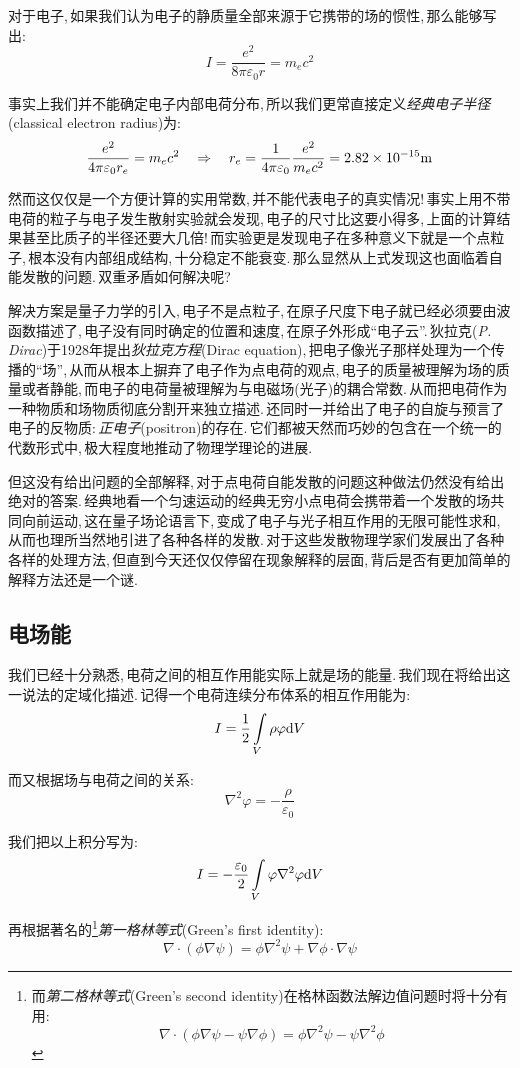 对于电子,\,如果我们认为电子的静质量全部来源于它携带的场的惯性,\,那么能够写出:
\[I=\frac{e^2}{8\pi\varepsilon_0 r}=m_e c^2\]

事实上我们并不能确定电子内部电荷分布,\,所以我们更常直接定义\emph{经典电子半径}(classical electron radius)为:
\[\frac{e^2}{4\pi\varepsilon_0 r_e}=m_e c^2\quad \Rightarrow \quad r_e=\frac{1}{4\pi\varepsilon_0} \frac{e^2}{m_e c^2}=2.82\times 10^{-15} {\rm m}\]

然而这仅仅是一个方便计算的实用常数,\,并不能代表电子的真实情况!\,事实上用不带电荷的粒子与电子发生散射实验就会发现,\,电子的尺寸比这要小得多,\,上面的计算结果甚至比质子的半径还要大几倍!\,而实验更是发现电子在多种意义下就是一个点粒子,\,根本没有内部组成结构,\,十分稳定不能衰变.\,那么显然从上式发现这也面临着自能发散的问题.\,双重矛盾如何解决呢?

解决方案是量子力学的引入,\,电子不是点粒子,\,在原子尺度下电子就已经必须要由波函数描述了,\,电子没有同时确定的位置和速度,\,在原子外形成``电子云''.\,狄拉克({\it P. Dirac})于1928年提出\emph{狄拉克方程}(Dirac equation),\,把电子像光子那样处理为一个传播的``场'',\,从而从根本上摒弃了电子作为点电荷的观点,\,电子的质量被理解为场的质量或者静能,\,而电子的电荷量被理解为与电磁场(光子)的耦合常数.\,从而把电荷作为一种物质和场物质彻底分割开来独立描述.\,还同时一并给出了电子的自旋与预言了电子的反物质:\,\emph{正电子}(positron)的存在.\,它们都被天然而巧妙的包含在一个统一的代数形式中,\,极大程度地推动了物理学理论的进展.

但这没有给出问题的全部解释,\,对于点电荷自能发散的问题这种做法仍然没有给出绝对的答案.\,经典地看一个匀速运动的经典无穷小点电荷会携带着一个发散的场共同向前运动,\,这在量子场论语言下,\,变成了电子与光子相互作用的无限可能性求和,\,从而也理所当然地引进了各种各样的发散.\,对于这些发散物理学家们发展出了各种各样的处理方法,\,但直到今天还仅仅停留在现象解释的层面,\,背后是否有更加简单的解释方法还是一个谜.


\subsection{电场能}

我们已经十分熟悉,\,电荷之间的相互作用能实际上就是场的能量.\,我们现在将给出这一说法的定域化描述.\,记得一个电荷连续分布体系的相互作用能为:
\[I=\frac{1}{2}\int\limits_V \rho\varphi\textrm{d} V\]

而又根据场与电荷之间的关系:
\[\nabla^2 \varphi=-\frac{\rho}{\varepsilon_0}\]

我们把以上积分写为:
\[I=-\frac{\varepsilon_0}{2}\int\limits_V \varphi\nabla^2\varphi\textrm{d} V\]

再根据著名的\footnote{而\emph{第二格林等式}(Green's second identity)在格林函数法解边值问题时将十分有用:
\[\nabla\cdot(\phi\nabla\psi-\psi\nabla\phi)=\phi\nabla^2\psi-\psi\nabla^2\phi\]}\emph{第一格林等式}(Green's first identity):
\[\nabla\cdot(\phi\nabla\psi)=\phi\nabla^2\psi+\nabla\phi\cdot\nabla\psi\]


